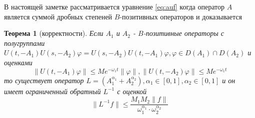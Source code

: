 \documentclass{cmfnre}
\theoremstyle{plain}
\newtheorem{theorem}{Теорема}[section]
\numberwithin{equation}{section}
\begin{document}
В настоящей заметке рассматривается уравнение \eqref{eq:auf} когда оператор $A$ является суммой дробных степеней
$B$-позитивных операторов и доказывается

\begin{theorem}[корректности]
    \label{theorem:one}
    Если $A_1$ и $A_2$ - $B$-позитивные операторы с полугруппами
    $U(t, -A_1)U(s, -A_2)\varphi = U(s, -A_2)U(t, -A_1)\varphi, \varphi \in D(A_1) \cap D(A_2)$ и оценками
    \begin{equation}
        \|U(t, -A_1)\varphi\| \le Me^{-\omega_1 t} \|\varphi\|, \|U(t, -A_2)\varphi\| \le Me^{-\omega_1 t}
    \end{equation}
    то существует оператор $L = (A_1^{\alpha_1} + A_2^{\alpha_2}), \alpha_1 \in [0, 1], \alpha_2 \in [0, 1]$
    и он имеет ограниченный обратный $L^{-1}$ с оценкой
    \begin{equation}
        \|L^{-1}f\| \le \frac{M_1 M_2 \|f\|}{\omega_1^{\alpha_1} \cdot \omega_2^{\alpha_2}}
    \end{equation}
\end{theorem}
\end{document}
